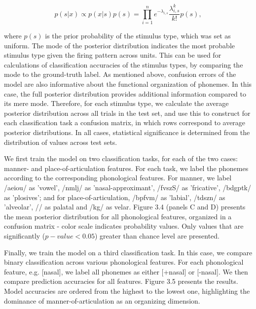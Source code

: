 \begin{equation}
    p(s|x) \propto p(x|s)p(s) = \prod_{i=1}^n{e^{-\lambda_{i,s}}\frac{\lambda_{i,s}^k}{k!}p(s)}, 
\end{equation}

where $p(s)$ is the prior probability of the stimulus type, which was set as uniform. The mode of the posterior distribution indicates the most probable stimulus type given the firing pattern across units. This can be used for calculations of classification accuracies of the stimulus types, by comparing the mode to the ground-truth label. As mentioned above, confusion errors of the model are also informative about the functional organization of phonemes. In this case, the full posterior distribution provides additional information compared to its mere mode. Therefore, for each stimulus type, we calculate the average posterior distribution across all trials in the test set, and use this to construct for each classification task a confusion matrix, in which rows correspond to average posterior distributions. In all cases, statistical significance is determined from the distribution of values across test sets.

We first train the model on two classification tasks, for each of the two cases: manner- and place-of-articulation features. For each task, we label the phonemes according to the corresponding phonological features. For manner, we label /aeiou/ as 'vowel', /nmlj/ as 'nasal-approximant', /fvszS/ as 'fricative', /bdgptk/ as 'plosives'; and for place-of-articulation, /bpfvm/ as 'labial', /tdszn/ as 'alveolar', // as palatal and /kg/ as velar. Figure 3.4 (panels C and D) presents the mean posterior distribution for all phonological features, organized in a confusion matrix - color scale indicates probability values. Only values that are significantly ($p-value<0.05$) greater than chance level are presented. 

Finally, we train the model on a third classification task. In this case, we compare binary classification across various phonological features. For each phonological feature, e.g. [nasal], we label all phonemes as either [+nasal] or [-nasal]. We then compare prediction accuracies for all features. Figure 3.5 presents the results. Model accuracies are ordered from the highest to the lowest one, highlighting the dominance of manner-of-articulation as an organizing dimension.

